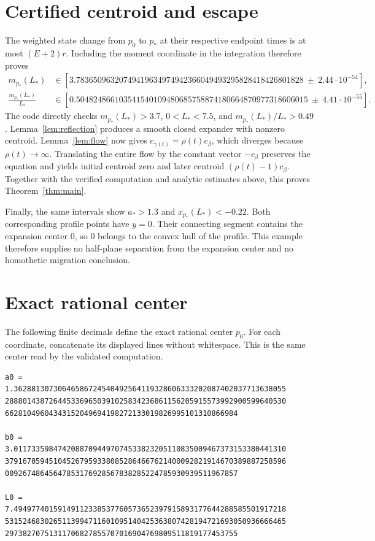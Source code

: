 \documentclass[11pt]{article}
\begin{document}
\section{Certified centroid and escape}
The weighted state change from $p_0$ to $p_*$ at their respective endpoint
times is at most $(E+2)r$. Including the moment coordinate in the integration
therefore proves
\begin{align*}
 m_{p_*}(L_*)&\in
 [3.78365096320749419634974942366049493295828418426801828
       \ \pm\ 2.44\cdot10^{-54}],\\
 \frac{m_{p_*}(L_*)}{L_*}&\in
 [0.504824866103541540109480685758874180664870977318606015
       \ \pm\ 4.41\cdot10^{-55}].
\end{align*}
The code directly checks $m_{p_*}(L_*)>3.7$, $0<L_*<7.5$, and
$m_{p_*}(L_*)/L_*>0.49$. Lemma~\ref{lem:reflection} produces a smooth
closed expander with nonzero centroid. Lemma~\ref{lem:flow} now gives
$c_{\gamma(t)}=\rho(t)c_\beta$, which diverges because $\rho(t)\to\infty$.
Translating the entire flow by the constant vector $-c_\beta$ preserves
the equation and yields initial centroid zero and later centroid
$(\rho(t)-1)c_\beta$. Together with the verified computation and analytic estimates above,
this proves Theorem~\ref{thm:main}.

Finally, the same intervals show $a_*>1.3$ and $x_{p_*}(L_*)<-0.22$.
Both corresponding profile points have $y=0$. Their connecting segment
contains the expansion center $0$, so $0$ belongs to the convex hull of
the profile. This example therefore supplies no half-plane separation
from the expansion center and no homothetic migration conclusion.

\appendix
\section{Exact rational center}
The following finite decimals define the exact rational center $p_0$.
For each coordinate, concatenate its displayed lines without whitespace.
This is the same center read by the validated computation.
\begin{verbatim}
a0 =
1.36288130730646586724540492564119328606333202087402037713638055
2888014387264453369650391025834236861156205915573992900599640530
66281049604343152049694198272133019826995101310866984

b0 =
3.01173359847420887094497074533823205110835009467373153380441310
3791670594510452679593380852864667621400092821914670389887258596
00926748645647853176928567838285224785930939511967857

L0 =
7.49497740159149112338537760573652397915893177644288585501917218
5315246830265113994711601095140425363807428194721693050936666465
29738270751311706827855707016904769809511819177453755

\end{verbatim}
\end{document}
